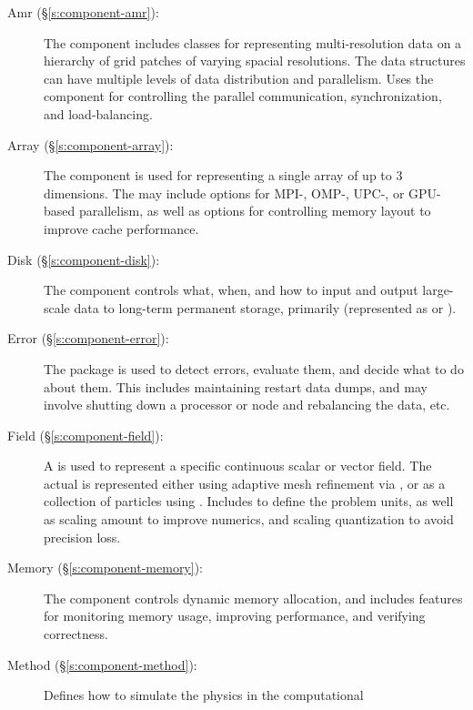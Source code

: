 \begin{description}
%
 \item [\todo Amr (\S\ref{s:component-amr}): ]
%
        The  component includes classes for representing
        multi-resolution data on a hierarchy of grid patches of
        varying spacial resolutions.  The  data
        structures can have multiple levels of data distribution and
        parallelism.  Uses the  component for
        controlling the parallel communication, synchronization, and
        load-balancing.
%
 \item [\todo Array (\S\ref{s:component-array}): ]
%
        The  component is used for representing a single
        array of up to $3$ dimensions.  The  may include
        options for MPI-, OMP-, UPC-, or GPU-based parallelism, as
        well as options for controlling memory layout to improve cache
        performance.
%
 \item [\todo Disk (\S\ref{s:component-disk}): ]
%
        The  component controls what, when, and how to
        input and output large-scale data to long-term permanent
        storage, primarily  (represented as
         or ).
%
 \item [\todo Error (\S\ref{s:component-error}): ]
%
        The  package is used to detect errors, evaluate
        them, and decide what to do about them.  This includes
        maintaining restart data dumps, and may involve shutting down
        a processor or node and rebalancing the data, etc.
%
 \item [\todo Field (\S\ref{s:component-field}): ]
%
        A  is used to represent a specific continuous
        scalar or vector field.  The actual  is
        represented either using adaptive mesh refinement via
        , or as a collection of particles using
        .  Includes  to define the problem
        units, as well as scaling amount to improve numerics, and
        scaling quantization to avoid precision loss.
%
 \item [\todo Memory (\S\ref{s:component-memory}): ]
%
        The  component controls dynamic memory
        allocation, and includes features for monitoring memory usage,
        improving performance, and verifying correctness.
%
 \item [\todo Method (\S\ref{s:component-method}): ]
%
        Defines how to simulate the physics in the computational

\end{description}
